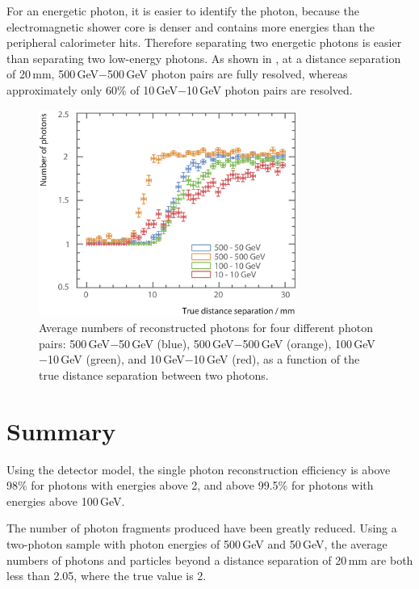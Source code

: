 For an energetic photon, it is easier to identify the photon, because the electromagnetic shower core is denser and contains more energies than the peripheral calorimeter hits. Therefore separating two energetic photons is easier than separating two low-energy photons. As shown in , at a distance separation of 20\,mm, 500\,GeV$-$500\,GeV photon pairs are fully resolved, whereas approximately only 60\% of 10\,GeV$-$10\,GeV photon pairs are resolved.

\begin{figure}[tbph]
\centering
        \includegraphics[width=0.75\textwidth]{photon/DoubleCompareEnergies2}
        \caption{Average numbers of reconstructed photons for four different photon pairs: 500\,GeV$-$50\,GeV (blue), 500\,GeV$-$500\,GeV (orange), 100\,GeV$-$10\,GeV (green), and 10\,GeV$-$10\,GeV (red), as a function of the true distance separation between two photons.}
        \label{fig:photonDoubleCompareEnergies}
\end{figure}

\section{Summary}

Using the \ILD detector model, the single photon reconstruction efficiency is above 98\% for photons with energies above 2\GeV, and above 99.5\% for photons with energies above 100\,GeV.

The number of photon fragments produced have been greatly reduced. Using a two-photon sample with photon energies of  500\,GeV and 50\,GeV, the average numbers of photons and particles beyond a distance separation of 20\,mm  are both less than 2.05, where the true value is 2.

